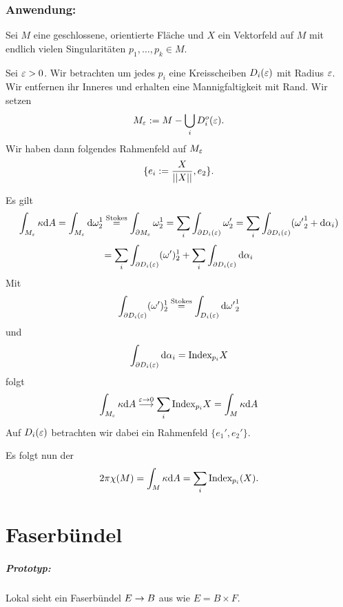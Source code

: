 \subsection{Anwendung:}
Sei $M$ eine geschlossene, orientierte Fläche und $X$ ein Vektorfeld auf $M$ mit endlich vielen Singularitäten $p_1,\ldots, p_k \in M$.

Sei $\varepsilon > 0$. Wir betrachten um jedes $p_i$ eine Kreisscheiben $D_i(\varepsilon)$ mit Radius $\varepsilon$. Wir entfernen ihr Inneres und erhalten eine Mannigfaltigkeit mit Rand. Wir setzen
\[ M_\varepsilon := M - \bigcup_i D^o_i(\varepsilon). \]
Wir haben dann folgendes Rahmenfeld auf $M_\varepsilon$
\[ \{ e_i := \frac{X}{\left|\left|X\right|\right|}, e_2 \}. \]

Es gilt
\[ \int_{M_\varepsilon} \kappa \text{d} A = \int_{M_\varepsilon} \text{d} \omega^1_2 \overset{\text{Stokes}}{=} \int_{\partial M_\varepsilon} \omega^1_2
= \sum_i \int_{\partial D_i(\varepsilon)} \omega_2' = \sum_i \int_{\partial D_i(\varepsilon)} ({\omega'}_2^1 + \text{d} \alpha_i) 
  \]
\[ = \sum_{i} \int_{\partial D_i(\varepsilon)} (\omega')^1_2 +\sum_{i} \int_{\partial D_i(\varepsilon)} \text{d} \alpha_i \]
Mit
\[ \int_{\partial D_i(\varepsilon)} (\omega')^1_2 \overset{\text{Stokes}}{=} \int_{D_i(\varepsilon)} \text{d} {\omega'}^1_2 \]
und
\[ \int_{\partial D_i(\varepsilon)} \text{d} \alpha_i = \text{Index}_{p_i}X \]
folgt
\[ \int_{M_\varepsilon} \kappa \text{d} A \overset{\varepsilon \overset{}{\rightarrow} 0}{\longrightarrow} \sum_i \text{Index}_{p_i}X  = \int_{M} \kappa \text{d} A \]
Auf $D_i(\varepsilon)$ betrachten wir dabei ein Rahmenfeld $\{ e_1', e_2' \}$.

Es folgt nun der 
\[ 2\pi \chi(M) = \int_M \kappa \text{d} A = \sum_i \text{Index}_{p_i}(X). \]


\chapter{Faserbündel}
\paragraph{Prototyp:} Lokal sieht ein Faserbündel $E \overset{}{\rightarrow} B$ aus wie $E = B \times F$.


